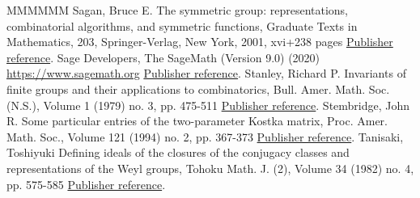 \documentclass[11pt]{article}
\theoremstyle{definition}
\numberwithin{equation}{section}
\begin{document}
\begin{thebibliography}{MMMMMM}
 Sagan, Bruce E. The symmetric group: representations, combinatorial algorithms, and symmetric functions, Graduate Texts in Mathematics, 203, Springer-Verlag, New York, 2001, xvi+238 pages \href{https://alco.centre-mersenne.org/articles/10.5802/alco.396/#Sagan}{Publisher reference}.
 Sage Developers, The SageMath (Version 9.0) (2020) \url{https://www.sagemath.org} \href{https://alco.centre-mersenne.org/articles/10.5802/alco.396/#sage}{Publisher reference}.
 Stanley, Richard P. Invariants of finite groups and their applications to combinatorics, Bull. Amer. Math. Soc. (N.S.), Volume 1 (1979) no. 3, pp. 475-511 \href{https://alco.centre-mersenne.org/articles/10.5802/alco.396/#Stanley}{Publisher reference}.
 Stembridge, John R. Some particular entries of the two-parameter Kostka matrix, Proc. Amer. Math. Soc., Volume 121 (1994) no. 2, pp. 367-373 \href{https://alco.centre-mersenne.org/articles/10.5802/alco.396/#Stembridge}{Publisher reference}.
 Tanisaki, Toshiyuki Defining ideals of the closures of the conjugacy classes and representations of the Weyl groups, Tohoku Math. J. (2), Volume 34 (1982) no. 4, pp. 575-585 \href{https://alco.centre-mersenne.org/articles/10.5802/alco.396/#Tanisaki}{Publisher reference}.
\end{thebibliography}
\end{document}
